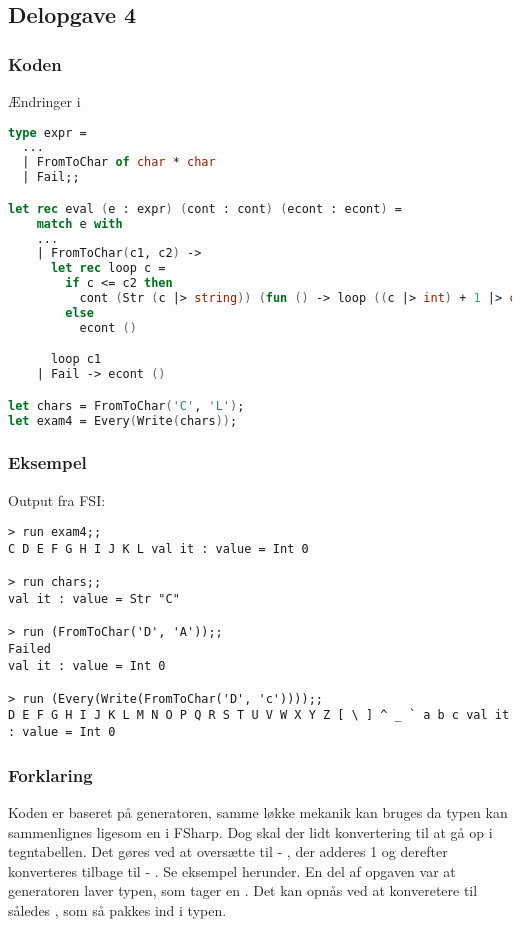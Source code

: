 \subsection{Delopgave 4}\label{ass:1-4}
\subsubsection{Koden}
Ændringer i 
\begin{lstlisting}[language=fsharp]
type expr = 
  ...
  | FromToChar of char * char
  | Fail;;

let rec eval (e : expr) (cont : cont) (econt : econt) = 
    match e with
    ...
    | FromToChar(c1, c2) ->
      let rec loop c =
        if c <= c2 then
          cont (Str (c |> string)) (fun () -> loop ((c |> int) + 1 |> char))
        else
          econt ()

      loop c1
    | Fail -> econt ()

let chars = FromToChar('C', 'L');
let exam4 = Every(Write(chars));
\end{lstlisting}

\subsubsection{Eksempel}
Output fra FSI:
\begin{lstlisting}
> run exam4;;
C D E F G H I J K L val it : value = Int 0

> run chars;;
val it : value = Str "C"

> run (FromToChar('D', 'A'));;
Failed
val it : value = Int 0

> run (Every(Write(FromToChar('D', 'c'))));;
D E F G H I J K L M N O P Q R S T U V W X Y Z [ \ ] ^ _ ` a b c val it : value = Int 0
\end{lstlisting}

\subsubsection{Forklaring}
Koden er baseret på  generatoren, samme løkke mekanik kan bruges da  typen kan sammenlignes ligesom en  i FSharp. Dog skal der lidt konvertering til at gå op i tegntabellen. Det gøres ved at oversætte  til  - , der adderes 1 og derefter konverteres tilbage til  - . Se eksempel herunder. En del af opgaven var at generatoren laver  typen, som tager en . Det kan opnås ved at konveretere  til  således , som så pakkes ind i  typen.

